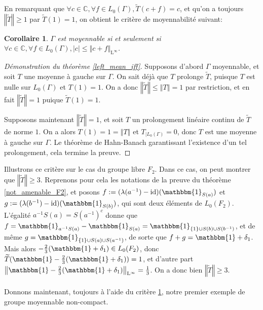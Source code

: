 \documentclass[a4paper,12pt]{article}
\newtheorem{corollary}[theorem]{Corollaire}
\newcommand{\C}{\mathbb{C}}
\newcommand{\norm}[1]{\left\Vert #1\right\Vert}
\newcommand{\abs}[1]{\left\vert#1\right\vert}
\newcommand{\set}[1]{\left\{ #1 \right\}}
\newcommand{\indic}{\mathbbm{1}}
\newcommand{\ssi}{si et seulement si }
\newcommand{\inv}{^{-1}}
\newcommand{\compl}{^c}
\DeclareMathOperator{\id}{id}
\begin{document}
En remarquant que $\forall c\in\C, \forall f\in L_0(\Gamma), \widetilde{T}(c + f) = c$, et qu'on a toujours 
$\norm{\widetilde{T}}\ge1$ par $\widetilde{T}(1) = 1$, on obtient le critère de moyennabilité suivant:

\begin{corollary}\label{amenable_iff_L0}
    $\Gamma$ est moyennable \ssi $\forall c\in\C, \forall f\in L_0(\Gamma), \abs{c}\le\norm{c + f}_{\mathrm{L}^\infty}$.
\end{corollary}

\begin{proof}[Démonstration du théorème \ref{left_mean_iff}]
    Supposons d'abord $\Gamma$ moyennable, et soit $T$ une moyenne à gauche sur $\Gamma$.
    On sait déjà que $T$ prolonge $\widetilde{T}$, puisque $T$ est nulle sur $L_0(\Gamma)$ et 
    $T(1)=1$. On a donc $\norm{\widetilde{T}}\le\norm{T}=1$ par restriction, et en fait $\norm{\widetilde{T}} = 1$
    puique $\widetilde{T}(1)=1$. 

    Supposons maintenant $\norm{\widetilde{T}}=1$, et soit $T$ un prolongement linéaire continu de $\widetilde{T}$ de norme $1$.
    On a alors $T(1)=1=\norm{T}$ et $T_{|L_0(\Gamma)} = 0$, donc $T$ est une moyenne à gauche sur $\Gamma$. Le théorème de Hahn-Banach
    garantissant l'existence d'un tel prolongement, cela termine la preuve.
\end{proof}

Illustrons ce critère sur le cas du groupe libre $F_2$. Dans ce cas, on peut montrer que $\norm{\widetilde{T}}\ge3$.
Reprenons pour cela les notations de la preuve du théorème \ref{not_amenable_F2}, et posons $f := (\lambda(a\inv)-\id)(\indic_{S(a)})$ et 
$g:=(\lambda(b\inv) - \id)(\indic_{S(b)})$, qui sont deux éléments de $L_0(F_2)$. L'égalité $a\inv S(a) = S(a\inv)\compl$ donne que 
$f = \indic_{a\inv S(a)} - \indic_{S(a)} = \indic_{\set{1}\cup S(b)\cup S(b\inv)}$, et de même 
$g = \indic_{\set{1}\cup S(a)\cup S(a\inv)}$, de sorte que $f+g=\indic + \delta_1$. Mais alors 
$-\frac23(\indic+\delta_1)\in L_0(F_2)$, donc $\widetilde{T}(\indic - \frac23(\indic+\delta_1)) = 1$, 
et d'autre part $\norm{\indic - \frac23(\indic+\delta_1)}_{\mathrm{L}^\infty}=\frac13$. 
On a donc bien $\norm{\widetilde{T}}\geq3$.

\paragraph{}

Donnons maintenant, toujours à l'aide du critère \ref{amenable_iff_L0}, notre premier exemple de groupe moyennable non-compact.
\end{document}
